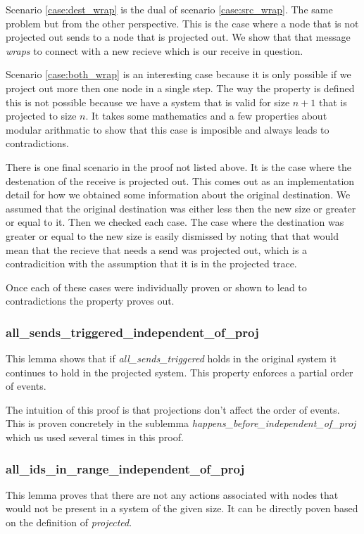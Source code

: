 \documentclass[runningheads]{llncs}
\begin{document}
Scenario \ref{case:dest_wrap} is the dual of scenario \ref{case:src_wrap}. The same problem but from the other perspective. This is the case where a node that is not projected out sends to a node that is projected out. We show that that message \emph{wraps} to connect with a new recieve which is our receive in question. %

Scenario \ref{case:both_wrap} is an interesting case because it is only possible if we project out more then one node in a single step. The way the property is defined this is not possible because we have a system that is valid for size $n+1$ that is projected to size $n$. It takes some mathematics and a few properties about modular arithmatic to show that this case is imposible and always leads to contradictions.

There is one final scenario in the proof not listed above. It is the case where the destenation of the receive is projected out. This comes out as an implementation detail for how we obtained some information about the original destination. We assumed that the original destination was either less then the new size or greater or equal to it. Then we checked each case. The case where the destination was greater or equal to the new size is easily dismissed by noting that that would mean that the recieve that needs a send was projected out, which is a contradicition with the assumption that it is in the projected trace.

Once each of these cases were individually proven or shown to lead to contradictions the property proves out.

\subsubsection{all\_sends\_triggered\_independent\_of\_proj}
This lemma shows that if \emph{all\_sends\_triggered} holds in the original system it continues to hold in the projected system. This property enforces a partial order of events.

The intuition of this proof is that projections don't affect the order of events. This is proven concretely in the sublemma \emph{happens\_before\_independent\_of\_proj} which us used several times in this proof. 

\subsubsection{all\_ids\_in\_range\_independent\_of\_proj}
This lemma proves that there are not any actions associated with nodes that would not be present in a system of the given size. It can be directly poven based on the definition of \emph{projected}. 
\end{document}
